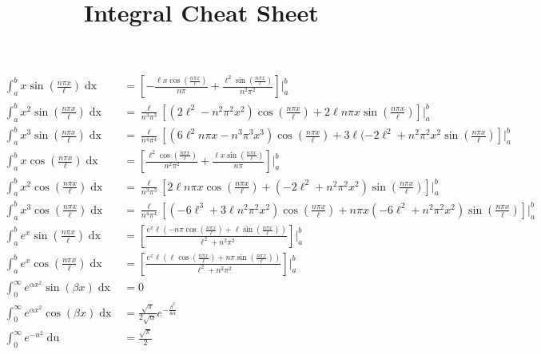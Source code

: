 \documentclass[fleqn]{article}
\title{Integral Cheat Sheet}
\date{}
\begin{document}
\maketitle
\begin{align*}
\int_{a}^{b}x\sin{\left(\frac{n\pi x}{\ell}\right)}\mathop{dx} &= \left[-\frac{\ell x \cos{\left( \frac{n \pi x}{\ell}\right)}}{n\pi} + \frac{\ell^{2}\sin{\left( \frac{n \pi x}{\ell}\right)}}{n^{2}\pi^{2}}\right]\Bigg|_{a}^{b}\\
%
\int_{a}^{b}x^{2}\sin{\left(\frac{n\pi x}{\ell}\right)}\mathop{dx} &= \frac{\ell}{n^{3}\pi^{3}}\left[(2\ell^{2}-n^{2}\pi^{2}x^{2})\cos{\left(\frac{n\pi x}{\ell}\right)} + 2\ell n\pi x\sin{\left(\frac{n\pi x}{\ell}\right)}\right]\Bigg|_{a}^{b}\\
%
\int_{a}^{b}x^{3}\sin{\left(\frac{n\pi x}{\ell}\right)}\mathop{dx} &= \frac{\ell}{n^{4}\pi^{4}}\left[(6\ell^{2}n\pi x - n^{3}\pi^{3}x^{3})\cos{\left(\frac{n\pi x}{\ell}\right)}  +3\ell(-2\ell^{2} + n^{2}\pi^{2}x^{2}\sin{\left(\frac{n\pi x}{\ell}\right)}\right]\Bigg|_{a}^{b}\\
%
\int_{a}^{b}x\cos{\left(\frac{n\pi x}{\ell}\right)}\mathop{dx} &= \left[\frac{\ell^{2}\cos{\left(\frac{n\pi x}{\ell}\right)}}{n^{2}\pi^{2}} + \frac{\ell x \sin{\left(\frac{n\pi x}{\ell}\right)}}{n\pi}\right]\Bigg|_{a}^{b}\\
%
\int_{a}^{b}x^{2}\cos{\left(\frac{n\pi x}{\ell}\right)}\mathop{dx} &= \frac{\ell}{n^{3}\pi^{3}}\left[2\ell n\pi x\cos{\left(\frac{n\pi x}{\ell}\right)} + \left(-2\ell^{2}+ n^{2}\pi^{2}x^{2}\right)\sin{\left(\frac{n\pi x}{\ell}\right)}\right]\Bigg|_{a}^{b}\\
%
\int_{a}^{b}x^{3}\cos{\left(\frac{n\pi x}{\ell}\right)}\mathop{dx} &= \frac{\ell}{n^{4}\pi^{4}}\left[(-6\ell^{3} + 3\ell n^{2}\pi^{2}x^{2})\cos{\left(\frac{n\pi x}{\ell}\right)} + n\pi x(-6\ell^{2} + n^{2}\pi^{2}x^{2})\sin{\left(\frac{n\pi x}{\ell}\right)}\right]\Bigg|_{a}^{b}\\
%
\int_{a}^{b}e^{x}\sin{\left(\frac{n\pi x}{\ell}\right)}\mathop{dx} &= \left[\frac{e^{x}\ell\left(-n\pi\cos{\left(\frac{n\pi x}{\ell}\right)} + \ell\sin{\left(\frac{n\pi x}{\ell}\right)}\right)}{\ell^{2}+ n^{2}\pi^{2}}\right]\Bigg|_{a}^{b}\\
%
\int_{a}^{b}e^{x}\cos{\left(\frac{n\pi x}{\ell}\right)}\mathop{dx} &= \left[\frac{e^{x}\ell\left(\ell\cos{\left(\frac{n\pi x}{\ell}\right)} + n\pi\sin{\left(\frac{n\pi x}{\ell}\right)}\right)}{\ell^{2}+ n^{2}\pi^{2}}\right]\Bigg|_{a}^{b}\\
%
\int_{0}^{\infty}e^{\alpha x^{2}}\sin{(\beta x)}\mathop{dx} &= 0\\
%
\int_{0}^{\infty}e^{\alpha x^{2}}\cos{(\beta x)}\mathop{dx} &= \frac{\sqrt{\pi}}{2\sqrt{\alpha}}e^{-\frac{\beta^{2}}{4\alpha}}\\
%
\int_{0}^{\infty}e^{-u^{2}}\mathop{du} &= \frac{\sqrt{\pi}}{2}
\end{align*}
\end{document}

